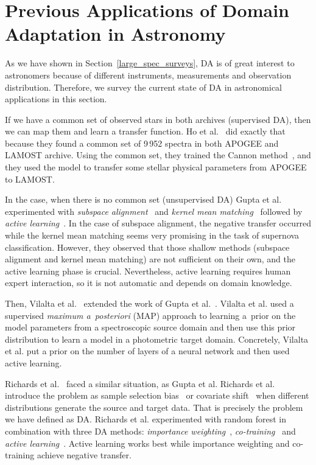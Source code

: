 \section{Previous Applications of Domain Adaptation in Astronomy}
\label{da_astronomy}

As we have shown in Section~\ref{large_spec_surveys},
DA is of great interest to astronomers
because of different instruments, measurements and observation distribution.
Therefore, we survey the current state of DA in astronomical applications in this section.

If we have a common set of observed stars in both archives (supervised DA),
then we can map them and learn a transfer function.
Ho et al.~\cite{ho2017} did exactly that
because they found a common set of 9\,952 spectra in both APOGEE and LAMOST archive.
Using the common set, they trained the Cannon method~\cite{ness2015},
and they used the model to transfer some stellar physical parameters from APOGEE to LAMOST.

In the case, when there is no common set (unsupervised DA)
Gupta et al.~\cite{gupta2016} experimented
with \textit{subspace alignment}~\cite{fernando2014}
and \textit{kernel mean matching}~\cite{gretton2009}
followed by \textit{active learning}~\cite{settles2009}.
In the case of subspace alignment,
the negative transfer occurred
while the kernel mean matching seems very promising in the task of supernova classification.
However, they observed that those shallow methods
(subspace alignment and kernel mean matching) are not sufficient on their own,
and the active learning phase is crucial.
Nevertheless, active learning requires human expert interaction,
so it is not automatic and depends on domain knowledge.

Then, Vilalta et al.~\cite{vilalta2018} extended the work of Gupta et al.~\cite{gupta2016}.
Vilalta et al. used a supervised \textit{maximum a~posteriori} (MAP) approach
to learning a~prior on the model parameters from a spectroscopic source domain
and then use this prior distribution to learn a model in a photometric target domain.
Concretely, Vilalta et al. put a prior on the number of layers of a neural network
and then used active learning.

Richards et al.~\cite{richards2011} faced a similar situation, as Gupta et al.
Richards et al. introduce the problem as sample selection bias~\cite{shimodaira2000} or covariate shift~\cite{heckman1979}
when different distributions generate the source and target data.
That is precisely the problem we have defined as DA.
Richards et al. experimented with random forest in combination with three DA methods:
\textit{importance weighting}~\cite{shimodaira2000},
\textit{co-training}~\cite{blum1998}
and \textit{active learning}~\cite{settles2009}.
Active learning works best while importance weighting and co-training achieve negative transfer.

